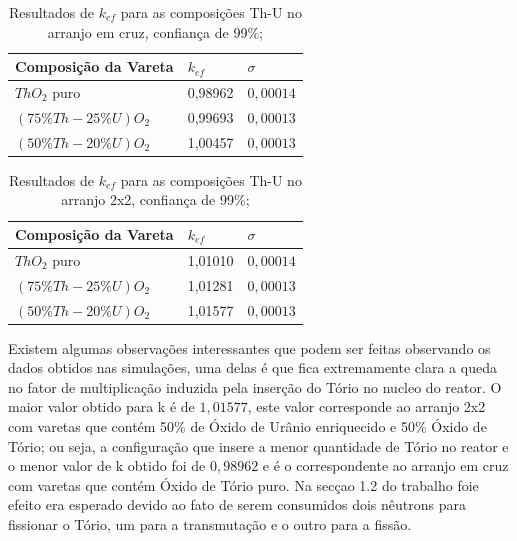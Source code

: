 \documentclass[
	12pt,				%
	openany,			%
	twoside,			%
	a4paper,			%
	english,			%
	french,				%
	spanish,			%
	brazil				%
	]{abntex2}
\begin{document}
\begin{center}
\newpage
\begin{longtable}{|l|l|l|}
\caption[Resultados de $k_{ef}$ para as composições Th-U no arranjo em cruz, confiança de 99\%;]{Resultados de $k_{ef}$ para as composições Th-U no arranjo em cruz, confiança de 99\%;}
\label{cross99} \\
\hline 
Composição da Vareta & $k_{ef}$ & $\sigma$\tabularnewline
\hline 
\hline 
$ThO_{2}$ puro & 0,98962 & $0,00014$ \tabularnewline
\hline 
 $(75\%Th-25\%U)O_{2}$ & 0,99693 & $0,00013$ \tabularnewline
\hline 
 $(50\%Th-20\%U)O_{2}$ & 1,00457 & $0,00013$ \tabularnewline
\hline 
\end{longtable}

\begin{longtable}{|l|l|l|}
\caption[Resultados de $k_{ef}$ para as composições Th-U no arranjo 2x2, confiança de 99\%;]{Resultados de $k_{ef}$ para as composições Th-U no arranjo 2x2, confiança de 99\%;}
\label{2x2_99} \\
\hline 
Composição da Vareta & $k_{ef}$ & $\sigma$\tabularnewline
\hline 
\hline 
$ThO_{2}$ puro & 1,01010 & $0,00014$ \tabularnewline
\hline 
 $(75\%Th-25\%U)O_{2}$ & 1,01281 & $0,00013$ \tabularnewline
\hline 
 $(50\%Th-20\%U)O_{2}$ & 1,01577 & $0,00013$ \tabularnewline
\hline 
\end{longtable}

\end{center}

Existem algumas observações interessantes que podem ser feitas observando os dados obtidos nas simulações, uma delas é que fica extremamente clara a queda no fator de multiplicação induzida pela inserção do Tório no nucleo do reator. O maior valor obtido para k é de $1,01577$, este valor corresponde ao arranjo 2x2 com varetas que contém 50\% de Óxido de Urânio enriquecido e 50\% Óxido de Tório; ou seja, a configuração que insere a menor quantidade de Tório no reator e o menor valor de k obtido foi de $0,98962$ e é o correspondente ao arranjo em cruz com varetas que contém Óxido de Tório puro. Na secçao 1.2 do trabalho foie efeito era esperado devido ao fato de serem consumidos dois nêutrons para fissionar o Tório, um para a transmutação e o outro para a fissão.
\end{document}
